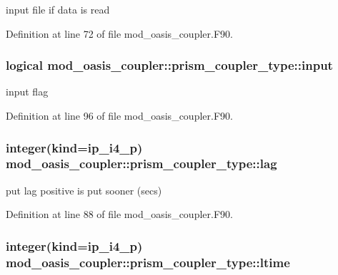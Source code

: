 input file if data is read 



Definition at line 72 of file mod\+\_\+oasis\+\_\+coupler.\+F90.

\hypertarget{structmod__oasis__coupler_1_1prism__coupler__type_a1cda09cced2782af8cdccae35a00107d}{
\subsubsection[{input}]{\setlength{\rightskip}{0pt plus 5cm}logical mod\+\_\+oasis\+\_\+coupler\+::prism\+\_\+coupler\+\_\+type\+::input\hspace{0.3cm}{\ttfamily [private]}}}\label{structmod__oasis__coupler_1_1prism__coupler__type_a1cda09cced2782af8cdccae35a00107d}


input flag 



Definition at line 96 of file mod\+\_\+oasis\+\_\+coupler.\+F90.

\hypertarget{structmod__oasis__coupler_1_1prism__coupler__type_a5f95dd90844b18f8c619df9371a556c6}{
\subsubsection[{lag}]{\setlength{\rightskip}{0pt plus 5cm}integer(kind=ip\+\_\+i4\+\_\+p) mod\+\_\+oasis\+\_\+coupler\+::prism\+\_\+coupler\+\_\+type\+::lag\hspace{0.3cm}{\ttfamily [private]}}}\label{structmod__oasis__coupler_1_1prism__coupler__type_a5f95dd90844b18f8c619df9371a556c6}


put lag positive is put sooner (secs) 



Definition at line 88 of file mod\+\_\+oasis\+\_\+coupler.\+F90.

\hypertarget{structmod__oasis__coupler_1_1prism__coupler__type_a5d93a8e5b39d3b713e8f1bf4760b10f9}{
\subsubsection[{ltime}]{\setlength{\rightskip}{0pt plus 5cm}integer(kind=ip\+\_\+i4\+\_\+p) mod\+\_\+oasis\+\_\+coupler\+::prism\+\_\+coupler\+\_\+type\+::ltime\hspace{0.3cm}{\ttfamily [private]}}}\label{structmod__oasis__coupler_1_1prism__coupler__type_a5d93a8e5b39d3b713e8f1bf4760b10f9}


